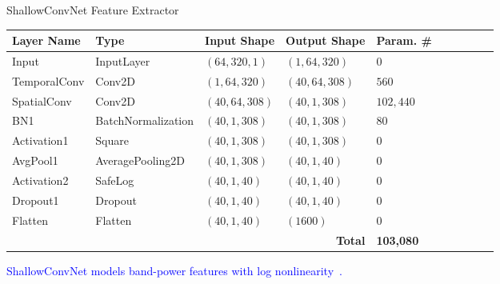 \documentclass[aspectratio=169]{beamer}
\let\oldcite\cite %
\renewcommand{\cite}[1]{{\tiny\oldcite{#1}}}
\begin{document}
\begin{frame}{ShallowConvNet Feature Extractor}

\begin{table}
\begin{tabularx}{\linewidth}{p{2.6cm}p{3.5cm}p{2.6cm}p{2.8cm}p{2.6cm}lcccc}
\toprule
\textbf{Layer Name} & \textbf{Type} & \textbf{Input Shape} & \textbf{Output Shape} & \textbf{Param. \#} \\
\midrule
Input         & InputLayer         & $(64,320,1)$   & $(1,64,320)$   & $0$ \\
TemporalConv  & Conv2D             & $(1,64,320)$   & $(40,64,308)$  & $560$ \\
SpatialConv   & Conv2D             & $(40,64,308)$  & $(40,1,308)$   & $102{,}440$ \\
BN1           & BatchNormalization & $(40,1,308)$   & $(40,1,308)$   & $80$ \\
Activation1   & Square             & $(40,1,308)$   & $(40,1,308)$   & $0$ \\
AvgPool1      & AveragePooling2D   & $(40,1,308)$   & $(40,1,40)$    & $0$ \\
Activation2   & SafeLog            & $(40,1,40)$    & $(40,1,40)$    & $0$ \\
Dropout1      & Dropout            & $(40,1,40)$    & $(40,1,40)$    & $0$ \\
Flatten       & Flatten            & $(40,1,40)$    & $(1600)$       & $0$ \\
\midrule
\multicolumn{4}{r}{\textbf{Total}} & \textbf{103{,}080} \\

\midrule

\end{tabularx}
\end{table}

\begin{center}
\textcolor{blue}{ShallowConvNet models band-power features with log nonlinearity~\cite{yusuf2025multi}.}
\end{center}
\end{frame}
\end{document}
